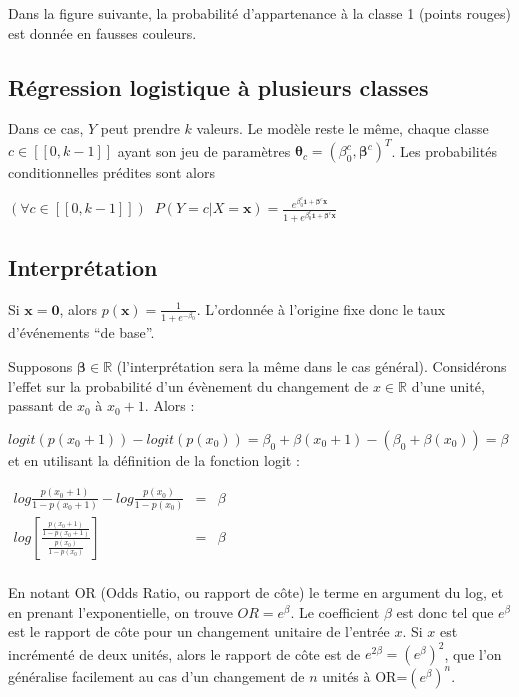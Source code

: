 \documentclass[letterpaper,10pt,english]{jupyterBook}
\begin{document}
\sphinxAtStartPar
Dans la figure suivante, la probabilité d’appartenance à la classe 1 (points rouges) est donnée en fausses couleurs.

\sphinxAtStartPar
{}


\subsection{Régression logistique à plusieurs classes}
\label{\detokenize{regression:regression-logistique-a-plusieurs-classes}}
\sphinxAtStartPar
Dans ce cas, \(Y\) peut prendre \(k\) valeurs. Le modèle reste le même, chaque classe \(c\in[\![0,k-1]\!]\) ayant son jeu de paramètres \(\boldsymbol\theta_c=(\beta^c_0,\boldsymbol\beta^c)^T\). Les probabilités conditionnelles prédites sont alors

\sphinxAtStartPar
\((\forall c\in[\![0,k-1]\!])\;\;P(Y=c|X=\mathbf x) = \frac{e^{\beta^c_0\mathbf 1 + \boldsymbol\beta^c\mathbf x}}{1+e^{\beta^c_0\mathbf 1 + \boldsymbol\beta^c\mathbf x}}\)


\subsection{Interprétation}
\label{\detokenize{regression:interpretation}}
\sphinxAtStartPar
Si \(\mathbf x=\mathbf 0\), alors \(p(\mathbf x)=\frac{1}{1+e^{-\beta_0}}\). L’ordonnée à l’origine fixe donc le taux d’événements “de base”.

\sphinxAtStartPar
Supposons \(\boldsymbol\beta\in\mathbb{R}\) (l’interprétation sera la même dans le cas général). Considérons l’effet sur la probabilité d’un évènement du changement de \(x\in\mathbb{R}\) d’une unité, passant de \(x_0\) à \(x_0+1\). Alors :

\sphinxAtStartPar
\(logit(p(x_0+1))-logit(p(x_0)) = \beta_0+\beta(x_0+1)-(\beta_0+\beta(x_0)) = \beta\)
et en utilisant la définition de la fonction logit :

\sphinxAtStartPar
\(\begin{eqnarray*}
log \frac{p( x_0+1)}{1-p(x_0+1)}-log \frac{p( x_0)}{1-p(x_0)} &=& \beta\\
log \left  [\frac{\frac{p( x_0+1)}{1-p(x_0+1)}}{\frac{p( x_0)}{1-p(x_0)}} \right ]&=& \beta\\
\end{eqnarray*}\)

\sphinxAtStartPar
En notant OR (Odds Ratio, ou rapport de côte) le terme en argument du log, et en prenant l’exponentielle, on trouve \(OR=e^\beta\). Le coefficient \(\beta\) est donc tel que \(e^\beta\) est le rapport de côte pour un changement unitaire de l’entrée \(x\). Si \(x\) est incrémenté de deux unités, alors le rapport de côte est de \(e^{2\beta}=(e^\beta)^2\), que l’on généralise facilement au cas d’un changement de \(n\) unités à OR=\((e^\beta)^n\).
\end{document}
